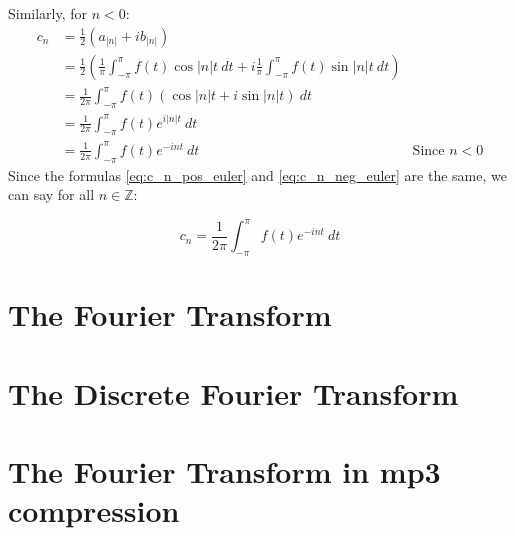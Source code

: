 \documentclass[12pt, titlepage]{article}
\numberwithin{equation}{section}
\let\oldsection\section
\renewcommand\section{\clearpage\oldsection}
\newcommand{\ahalf}{\frac{1}{2}}
\newcommand{\piint}{\int_{-\pi}^{\pi}} %
\begin{document}
Similarly, for $n < 0$:
%
\begin{align}
    c_n &= \ahalf(a_{|n|} + ib_{|n|}) \nonumber \\
        &= \ahalf \left(\frac{1}{\pi} \piint f(t)\cos{|n|t}\ dt 
            + i\frac{1}{\pi}\piint f(t)\sin{|n|t}\ dt \right) \nonumber \\
        &= \frac{1}{2\pi}\piint f(t) (\cos{|n|t} + i\sin{|n|t})\ dt \nonumber \\
        &= \frac{1}{2\pi}\piint f(t) e^{i|n|t}\ dt \nonumber \\
        &= \frac{1}{2\pi}\piint f(t) e^{-int}\ dt & \text{Since }n<0 \label{eq:c_n_neg_euler}
\end{align}
%
Since the formulas \eqref{eq:c_n_pos_euler} and \eqref{eq:c_n_neg_euler} are the same, we
can say for all $n \in \mathbb{Z}$:
\begin{mdframed}
    \begin{equation*}
        c_n = \frac{1}{2\pi}\piint f(t) e^{-int}\ dt
    \end{equation*}
\end{mdframed}


\section{The Fourier Transform}
\section{The Discrete Fourier Transform}
\section{The Fourier Transform in mp3 compression}

\printbibliography
\end{document}
